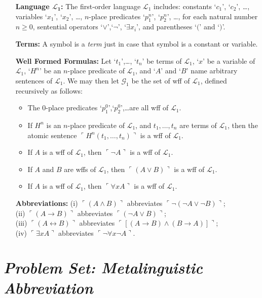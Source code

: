 \documentclass[a4paper, 11pt]{article} %
\newcommand{\corner}[1]{\ulcorner#1\urcorner} %
\renewcommand{\L}[0]{\mathcal{L}}
\begin{document}
\begin{enumerate}[leftmargin=1.2in,labelsep=.15in] %
\item[\bf Language $\boldsymbol{\L_1}$:] The first-order language $\L_1$ includes: constants `$c_1$', `$c_2$', \dots, variables `$x_1$', `$x_2$', \dots, $n$-place predicates `$p_1^n$', `$p_2^n$', \dots, for each natural number $n\geq0$, sentential operators `$\vee$',`$\neg$', `$\exists x_i$', and parentheses `$($' and `$)$'.
\item[\bf Terms:] A symbol is a \textit{term} just in case that symbol is a constant or variable.
\item[\bf Well Formed Formulas:] Let `$t_1$',\dots, `$t_n$' be terms of $\L_1$, `$x$' be a variable of $\L_1$, `$H^n$' be an $n$-place predicate of $\L_1$, and `$A$' and `$B$' name arbitrary sentences of $\L_1$. We may then let $\mathcal{G}_1$ be the set of wff of $\L_1$, defined recursively as follows:
\begin{itemize}
\item The 0-place predicates `$p_1^0$',`$p_2^0$',\dots are all wff of $\L_1$.
\item If ${H^n}$ is an $n$-place predicate of $\L_1$, and ${t_1},\dots,{t_n}$ are terms of $\L_1$, then the atomic sentence $\corner{H^n(t_1,\dots,t_n)}$ is a wff of $\L_1$.
\item If ${A}$ is a wff of $\L_1$, then $\corner{\neg A}$ is a wff of $\L_1$.
\item If ${A}$ and ${B}$ are wffs of $\L_1$, then $\corner{(A\vee B)}$ is a wff of $\L_1$.
\item If ${A}$ is a wff of $\L_1$, then $\corner{\forall xA}$ is a wff of $\L_1$.
\end{itemize}
\item[\bf Abbreviations:] (i) $\corner{(A\wedge B)}$ abbreviates $\corner{\neg(\neg A\vee\neg B)}$;\\ (ii) $\corner{(A\rightarrow B)}$ abbreviates $\corner{(\neg A\vee B)}$;\\ (iii) $\corner{(A\leftrightarrow B)}$ abbreviates $\corner{[(A\rightarrow B)\wedge(B\rightarrow A)]}$;\\ (iv) $\corner{\exists xA}$ abbreviates $\corner{\neg\forall x\neg A}$.
\end{enumerate}



\section*{\it Problem Set: Metalinguistic Abbreviation}
\end{document}
